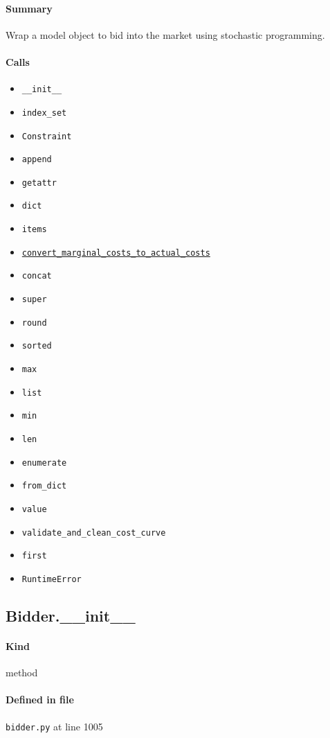 \documentclass[11pt]{report}
\begin{document}
\paragraph{Summary} Wrap a model object to bid into the market using stochastic programming.
\paragraph{Calls}
\begin{itemize}[leftmargin=*]
  \item \texttt{\_\_init\_\_}
  \item \texttt{index\_set}
  \item \texttt{Constraint}
  \item \texttt{append}
  \item \texttt{getattr}
  \item \texttt{dict}
  \item \texttt{items}
  \item \hyperref[def:utils.py:convert_marginal_costs_to_actual_costs:L15]{\texttt{convert\_marginal\_costs\_to\_actual\_costs}}
  \item \texttt{concat}
  \item \texttt{super}
  \item \texttt{round}
  \item \texttt{sorted}
  \item \texttt{max}
  \item \texttt{list}
  \item \texttt{min}
  \item \texttt{len}
  \item \texttt{enumerate}
  \item \texttt{from\_dict}
  \item \texttt{value}
  \item \texttt{validate\_and\_clean\_cost\_curve}
  \item \texttt{first}
  \item \texttt{RuntimeError}
\end{itemize}
\subsection{Bidder.\_\_init\_\_}
\label{def:bidder.py:Bidder.__init__:L1005}
\paragraph{Kind} method
\paragraph{Defined in file} \texttt{bidder.py} at line 1005
\end{document}
